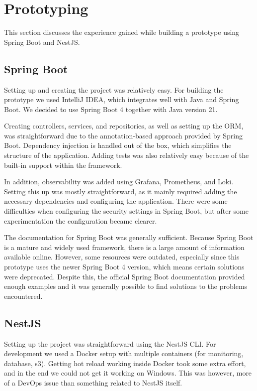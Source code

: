 \section{Prototyping}\label{sec:prototyping}
This section discusses the experience gained while building a prototype using Spring Boot and NestJS.

\subsection{Spring Boot}
Setting up and creating the project was relatively easy.
For building the prototype we used IntelliJ IDEA, which integrates well with Java and Spring Boot.
We decided to use Spring Boot 4 together with Java version 21.

Creating controllers, services, and repositories, as well as setting up the ORM, was straightforward due to the annotation-based approach provided by Spring Boot.
Dependency injection is handled out of the box, which simplifies the structure of the application.
Adding tests was also relatively easy because of the built-in support within the framework.

In addition, observability was added using Grafana, Prometheus, and Loki. Setting this up was mostly straightforward, as it mainly required adding the necessary dependencies and configuring the application.
There were some difficulties when configuring the security settings in Spring Boot, but after some experimentation the configuration became clearer.

The documentation for Spring Boot was generally sufficient.
Because Spring Boot is a mature and widely used framework, there is a large amount of information available online.
However, some resources were outdated, especially since this prototype uses the newer Spring Boot 4 version, which means certain solutions were deprecated.
Despite this, the official Spring Boot documentation provided enough examples and it was generally possible to find solutions to the problems encountered.

\subsection{NestJS}
Setting up the project was straightforward using the NestJS CLI.
For development we used a Docker setup with multiple containers (for monitoring, database, s3).
Getting hot reload working inside Docker took some extra effort, and in the end we could not get it working on Windows.
This was however, more of a DevOps issue than something related to NestJS itself.

